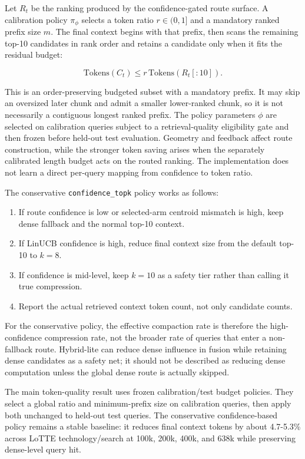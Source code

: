 Let $R_t$ be the ranking produced by the confidence-gated route surface. A calibration policy $\pi_\phi$ selects a token ratio $r \in (0,1]$ and a mandatory ranked prefix size $m$. The final context begins with that prefix, then scans the remaining top-10 candidates in rank order and retains a candidate only when it fits the residual budget:

\[
\mathrm{Tokens}(C_t) \le r\,\mathrm{Tokens}(R_t[:10]).
\]

This is an order-preserving budgeted subset with a mandatory prefix. It may skip an oversized later chunk and admit a smaller lower-ranked chunk, so it is not necessarily a contiguous longest ranked prefix. The policy parameters $\phi$ are selected on calibration queries subject to a retrieval-quality eligibility gate and then frozen before held-out test evaluation. Geometry and feedback affect route construction, while the stronger token saving arises when the separately calibrated length budget acts on the routed ranking. The implementation does not learn a direct per-query mapping from confidence to token ratio.

The conservative \nolinkurl{confidence_topk} policy works as follows:

\begin{enumerate}
\item If route confidence is low or selected-arm centroid mismatch is high, keep dense fallback and the normal top-10 context.
\item If LinUCB confidence is high, reduce final context size from the default top-10 to $k=8$.
\item If confidence is mid-level, keep $k=10$ as a safety tier rather than calling it true compression.
\item Report the actual retrieved context token count, not only candidate counts.
\end{enumerate}

For the conservative policy, the effective compaction rate is therefore the high-confidence compression rate, not the broader rate of queries that enter a non-fallback route. Hybrid-lite can reduce dense influence in fusion while retaining dense candidates as a safety net; it should not be described as reducing dense computation unless the global dense route is actually skipped.

The main token-quality result uses frozen calibration/test budget policies. They select a global ratio and minimum-prefix size on calibration queries, then apply both unchanged to held-out test queries. The conservative confidence-based policy remains a stable baseline: it reduces final context tokens by about 4.7-5.3\% across LoTTE technology/search at 100k, 200k, 400k, and 638k while preserving dense-level query hit.

